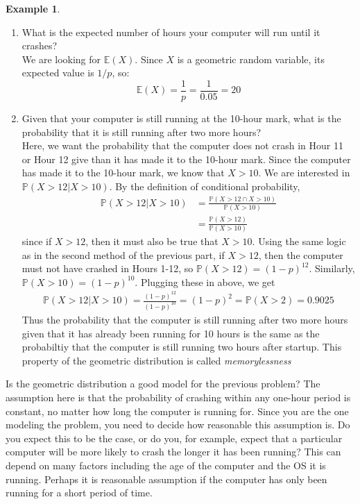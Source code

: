 \documentclass[12pt]{article}
\theoremstyle{definition}
\newtheorem*{example}{Example}
\theoremstyle{remark}
\def\P{{\mathbb P}}
\def\E{{\mathbb E}}
\begin{document}
\begin{example}
\begin{enumerate}
\item What is the expected number of hours your computer will run until it crashes?\\

We are looking for $\E(X)$. Since $X$ is a geometric random variable, its expected value is $1/p$, so:
\[
\E(X) = \frac{1}{p} = \frac{1}{0.05} = 20
\]

\item Given that your computer is still running at the 10-hour mark, what is the probability that it is still running after two more hours?\\

Here, we want the probability that the computer does not crash in Hour 11 or Hour 12 give than it has made it to the 10-hour mark. Since the computer has made it to the 10-hour mark, we know that $X > 10$. We are interested in $\P(X > 12 | X > 10)$. By the definition of conditional probability,
\begin{align*}
\P(X > 12 | X > 10) &= \frac{\P(X > 12 \cap X > 10)}{\P(X>10)}\\
&= \frac{\P(X > 12)}{\P(X>10)}
\end{align*}
since if $X > 12$, then it must also be true that $X > 10$. Using the same logic as in the second method of the previous part, if $X>12$, then the computer must not have crashed in Hours 1-12, so $\P(X > 12) = (1-p)^{12}$. Similarly, $\P(X > 10) = (1-p)^{10}$. Plugging these in above, we get
\begin{align*}
\P(X > 12 | X > 10) = \frac{(1-p)^{12}}{(1-p)^{10}} = (1-p)^2 = \P(X > 2) = 0.9025
\end{align*}
Thus the probability that the computer is still running after two more hours given that it has already been running for 10 hours is the same as the probabiltiy that the computer is still running two hours after startup. This property of the geometric distribution is called \emph{memorylessness}
\end{enumerate}
\end{example}

Is the geometric distribution a good model for the previous problem? The assumption here is that the probability of crashing within any one-hour period is constant, no matter how long the computer is running for. Since you are the one modeling the problem, you need to decide how reasonable this assumption is. Do you expect this to be the case, or do you, for example, expect that a particular computer will be more likely to crash the longer it has been running? This can depend on many factors including the age of the computer and the OS it is running. Perhaps it is reasonable assumption if the computer has only been running for a short period of time. \\
\end{document}
